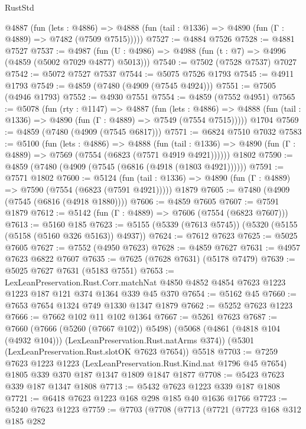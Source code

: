 \begin{lexlean}{RustStd}
\begin{coremodule}
    @4887
      (fun (lets : @4886) =>
      @4888 (fun (tail : @1336) => @4890 (fun (Γ : @4889) => @7482 (@7509 @7515)))))
@7527 := @4884 @7526
@7528 := @4881 @7527
@7537 := @4987 (fun (U : @4986) => @4988 (fun (t : @7) => @4996 (@4859 (@5002 @7029 @4877) @5013)))
@7540 := @7502 (@7528 @7537) @7027
@7542 := @5072 @7527 @7537
@7544 := @5075 @7526 @1793
@7545 := @4911 @1793
@7549 := @4859 (@7480 (@4909 (@7545 @4924)))
@7551 := @7505 (@4946 @1793)
@7552 := @4930 @7551
@7554 := @4859 (@7552 @4951)
@7565 := @5078
    (fun (rty : @1147) =>
    @4887
      (fun (lets : @4886) =>
      @4888 (fun (tail : @1336) => @4890 (fun (Γ : @4889) => @7549 (@7554 @7515)))))
    @1704
@7569 := @4859 (@7480 (@4909 (@7545 @6817)))
@7571 := @6824 @7510 @7032
@7583 := @5100
    (fun (lets : @4886) =>
    @4888
      (fun (tail : @1336) => @4890 (fun (Γ : @4889) => @7569 (@7554 (@6823 (@7571 @4919 @4921))))))
    @1802
@7590 := @4859 (@7480 (@4909 (@7545 (@6816 (@4918 (@1803 @4921))))))
@7591 := @7571 @1802
@7600 := @5124
    (fun (tail : @1336) => @4890 (fun (Γ : @4889) => @7590 (@7554 (@6823 (@7591 @4921)))))
    @1879
@7605 := @7480 (@4909 (@7545 (@6816 (@4918 @1880))))
@7606 := @4859 @7605
@7607 := @7591 @1879
@7612 := @5142 (fun (Γ : @4889) => @7606 (@7554 (@6823 @7607)))
@7613 := @5160 @185
@7623 := @5155 (@5339 (@7613 @5745)) (@5320 (@5155 (@5158 (@5160 @326 @5163)) @4937))
@7624 := @7612 @7623
@7625 := @5025 @7605
@7627 := @7552 (@4950 @7623)
@7628 := @4859 @7627
@7631 := @4957 @7623 @6822 @7607
@7635 := @7625 (@7628 @7631) (@5178 @7479)
@7639 := @5025 @7627 @7631 (@5183 @7551)
@7653 := LexLeanPreservation.Rust.Corr.matchNat
    @4850
    @4852
    @4854
    @7623
    @1223
    @1223
    @187
    @121
    @374
    @1364
    @339
    @45
    @370
@7654 := @5162 @45
@7660 := @7653 @7654 @1324 @749 @1330 @1347 @1879
@7662 := @5252 @7623 @1223
@7666 := @7662 @102 @11 @102 @1364
@7667 := @5261 @7623
@7687 := @7660
    (@7666 (@5260 (@7667 @102)) @5498)
    (@5068 (@4861 (@4818 @104 (@4932 @104))) (LexLeanPreservation.Rust.natArms @374))
    (@5301 (LexLeanPreservation.Rust.slotOK @7623 @7654))
    @5518
@7703 := @7259
    @7623
    @1223
    @1223
    (LexLeanPreservation.Rust.Kind.nat @1796 @45 @7654)
    @1805
    @339
    @370
    @187
    @1347
    @1809
    @1847
    @1877
@7708 := @5423 @7623 @339 @187 @1347 @1808
@7713 := @5432 @7623 @1223 @339 @187 @1808
@7721 := @6418 @7623 @1223 @168 @298 @185 @40 @1636 @1766
@7723 := @5240 @7623 @1223
@7759 := @7703
    (@7708
      (@7713
        (@7721
          (@7723
            @168
            @312
            @185
            @282

\end{coremodule}
\end{lexlean}
